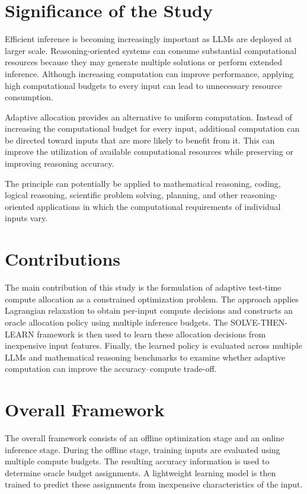 \documentclass[12pt,a4paper,titlepage]{report}
\begin{document}
\section{Significance of the Study}

Efficient inference is becoming increasingly important as LLMs are deployed at larger scale. Reasoning-oriented systems can consume substantial computational resources because they may generate multiple solutions or perform extended inference. Although increasing computation can improve performance, applying high computational budgets to every input can lead to unnecessary resource consumption.

Adaptive allocation provides an alternative to uniform computation. Instead of increasing the computational budget for every input, additional computation can be directed toward inputs that are more likely to benefit from it. This can improve the utilization of available computational resources while preserving or improving reasoning accuracy.

The principle can potentially be applied to mathematical reasoning, coding, logical reasoning, scientific problem solving, planning, and other reasoning-oriented applications in which the computational requirements of individual inputs vary.

\section{Contributions}

The main contribution of this study is the formulation of adaptive test-time compute allocation as a constrained optimization problem. The approach applies Lagrangian relaxation to obtain per-input compute decisions and constructs an oracle allocation policy using multiple inference budgets. The SOLVE-THEN-LEARN framework is then used to learn these allocation decisions from inexpensive input features. Finally, the learned policy is evaluated across multiple LLMs and mathematical reasoning benchmarks to examine whether adaptive computation can improve the accuracy--compute trade-off.

\section{Overall Framework}

The overall framework consists of an offline optimization stage and an online inference stage. During the offline stage, training inputs are evaluated using multiple compute budgets. The resulting accuracy information is used to determine oracle budget assignments. A lightweight learning model is then trained to predict these assignments from inexpensive characteristics of the input.
\end{document}
